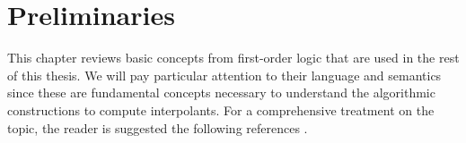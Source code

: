 \chapter {Preliminaries} \label{preliminaries}

This chapter reviews basic concepts from first-order logic that are used in the rest of this thesis. We will pay particular attention to their language and semantics since these are fundamental concepts necessary to understand the algorithmic constructions to compute interpolants. For a comprehensive treatment on the topic, the reader is suggested the following references \cite{10.5555/1642730, DBLP:books/daglib/0076838}.







